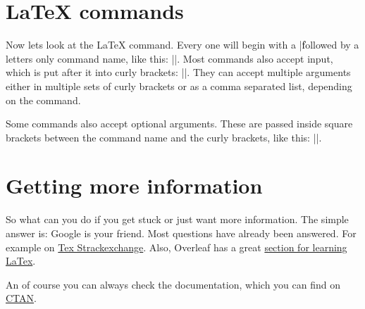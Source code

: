     \section{LaTeX commands}
        Now lets look at the LaTeX command. Every one will begin with a |\| followed by a letters only command name, like this:
        |\command|. Most commands also accept input, which is put after it into curly brackets: ||. They can
        accept multiple arguments either in multiple sets of curly brackets or as a comma separated list, depending on the command.

        Some commands also accept optional arguments. These are passed inside square brackets between the command name and the curly brackets, like
        this: ||.

    \section{Getting more information}
        So what can you do if you get stuck or just want more information. The simple answer is: Google is your friend. Most questions have already
        been answered. For example on \href{https://tex.stackexchange.com/}{Tex Strackexchange}. Also, Overleaf has a great
        \href{https://www.overleaf.com/learn}{section for learning LaTex}.

        An of course you can always check the documentation, which you can find on \href{https://ctan.org/}{CTAN}.

